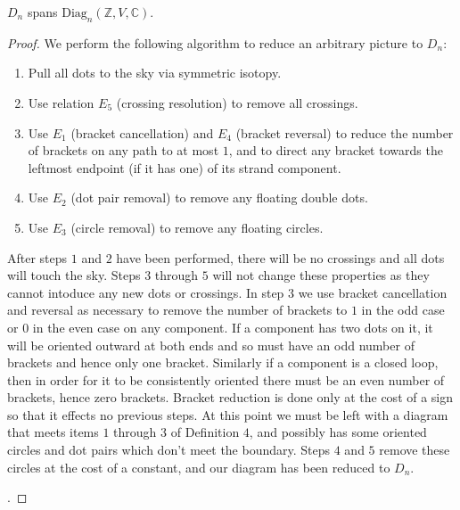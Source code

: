 \documentclass[11pt]{article} %
\begin{document}
\begin{prop}
$D_n$ spans $\text{Diag}_n({\mathbb{Z},V,\mathbb{C}})$.
\end{prop}
\begin{proof}
We perform the following algorithm to reduce an arbitrary picture to $D_n$:
\begin{enumerate}
\item Pull all dots to the sky via symmetric isotopy.
\item Use relation $E_5$ (crossing resolution) to remove all crossings.
\item Use $E_1$ (bracket cancellation) and $E_4$ (bracket reversal) to reduce the number of brackets on any path to at most $1$, and to direct any bracket towards the leftmost endpoint (if it has one) of its strand component.
\item Use $E_2$ (dot pair removal) to remove any floating double dots. 
\item Use $E_3$ (circle removal) to remove any floating circles.
\end{enumerate}
After steps $1$ and $2$ have been performed, there will be no crossings and all dots will touch the sky. Steps $3$ through $5$ will not change these properties as they cannot intoduce any new dots or crossings. In step 3 we use bracket cancellation and reversal as necessary to remove the number of brackets to $1$ in the odd case or $0$ in the even case on any component. If a component has two dots on it, it will be oriented outward at both ends and so must have an odd number of brackets and hence only one bracket. Similarly if a component is a closed loop, then in order for it to be consistently oriented there must be an even number of brackets, hence zero brackets.  Bracket reduction is done only at the cost of a sign so that it effects no previous steps. At this point we must be left with a diagram that meets items $1$ through $3$ of Definition $4$, and possibly has some oriented circles and dot pairs which don't meet the boundary. Steps $4$ and $5$ remove these circles at the cost of a constant, and our diagram has been reduced to $D_n$.

.
\end{proof}
\end{document}
